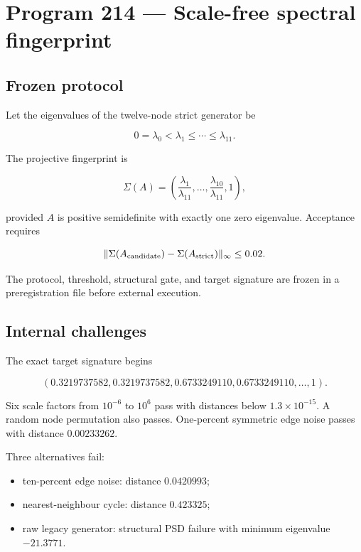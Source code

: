 \documentclass[11pt,a4paper,openany]{report}
\begin{document}
\chapter{Program 214 --- Scale-free spectral fingerprint}

\section{Frozen protocol}

Let the eigenvalues of the twelve-node strict generator be

\[
0=\lambda_0<\lambda_1\le\cdots\le\lambda_{11}.
\]

The projective fingerprint is

\[
\Sigma(A)=
\left(
\frac{\lambda_1}{\lambda_{11}},
\ldots,
\frac{\lambda_{10}}{\lambda_{11}},
1
\right),
\]

provided \(A\) is positive semidefinite with exactly one zero eigenvalue. Acceptance requires

\[
\|\Sigma(A_{\rm candidate})-\Sigma(A_{\rm strict})\|_\infty\le0.02.
\]

The protocol, threshold, structural gate, and target signature are frozen in a preregistration file before external execution.

\section{Internal challenges}

The exact target signature begins

\[
(0.3219737582,0.3219737582,
0.6733249110,0.6733249110,\ldots,1).
\]

Six scale factors from \(10^{-6}\) to \(10^6\) pass with distances below \(1.3\times10^{-15}\). A random node permutation also passes. One-percent symmetric edge noise passes with distance \(0.00233262\).

Three alternatives fail:

\begin{itemize}
\item 
ten-percent edge noise: distance \(0.0420993\);

\item 
nearest-neighbour cycle: distance \(0.423325\);

\item 
raw legacy generator: structural PSD failure with minimum eigenvalue \(-21.3771\).

\end{itemize}
\end{document}
